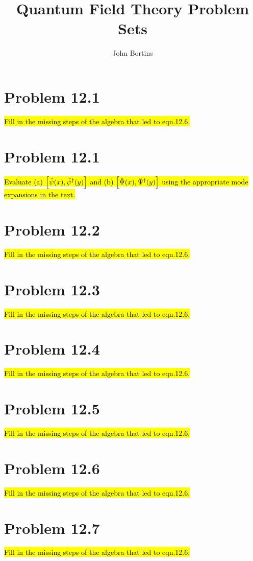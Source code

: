 \documentclass{article}
\title{Quantum Field Theory Problem Sets}
\author{John Bortins}
\begin{document}
\maketitle{}



\section*{Problem 12.1}
\begin{quoting}
    \hl{Fill in the missing steps of the algebra that led to eqn.12.6.}
\end{quoting}


\section*{Problem 12.1}
\begin{quoting}
    \hl{Evaluate (a) $\bqty{\hat{\psi}(x),\hat{\psi}^\dagger (y)}$ and (b) $\bqty{\hat{\Psi}(x),\hat{\Psi}^\dagger (y)}$ using the appropriate mode expansions in the text.}
\end{quoting}


\section*{Problem 12.2}
\begin{quoting}
    \hl{Fill in the missing steps of the algebra that led to eqn.12.6.}
\end{quoting}


\section*{Problem 12.3}
\begin{quoting}
    \hl{Fill in the missing steps of the algebra that led to eqn.12.6.}
\end{quoting}


\section*{Problem 12.4}
\begin{quoting}
    \hl{Fill in the missing steps of the algebra that led to eqn.12.6.}
\end{quoting}


\section*{Problem 12.5}
\begin{quoting}
    \hl{Fill in the missing steps of the algebra that led to eqn.12.6.}
\end{quoting}


\section*{Problem 12.6}
\begin{quoting}
    \hl{Fill in the missing steps of the algebra that led to eqn.12.6.}
\end{quoting}

\section*{Problem 12.7}
\begin{quoting}
    \hl{Fill in the missing steps of the algebra that led to eqn.12.6.}
\end{quoting}
\end{document}
